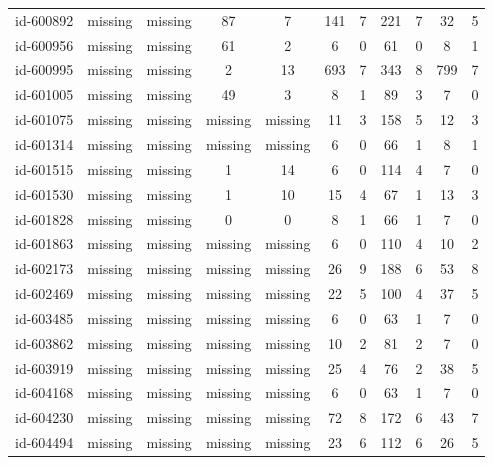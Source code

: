 \begin{tabular}{ccccccccccc}
id-600892 & missing & missing & 87 & 7 & 141 & 7 & 221 & 7 & 32 & 5\\
id-600956 & missing & missing & 61 & 2 & 6 & 0 & 61 & 0 & 8 & 1\\
id-600995 & missing & missing & 2 & 13 & 693 & 7 & 343 & 8 & 799 & 7\\
id-601005 & missing & missing & 49 & 3 & 8 & 1 & 89 & 3 & 7 & 0\\
id-601075 & missing & missing & missing & missing & 11 & 3 & 158 & 5 & 12 & 3\\
id-601314 & missing & missing & missing & missing & 6 & 0 & 66 & 1 & 8 & 1\\
id-601515 & missing & missing & 1 & 14 & 6 & 0 & 114 & 4 & 7 & 0\\
id-601530 & missing & missing & 1 & 10 & 15 & 4 & 67 & 1 & 13 & 3\\
id-601828 & missing & missing & 0 & 0 & 8 & 1 & 66 & 1 & 7 & 0\\
id-601863 & missing & missing & missing & missing & 6 & 0 & 110 & 4 & 10 & 2\\
id-602173 & missing & missing & missing & missing & 26 & 9 & 188 & 6 & 53 & 8\\
id-602469 & missing & missing & missing & missing & 22 & 5 & 100 & 4 & 37 & 5\\
id-603485 & missing & missing & missing & missing & 6 & 0 & 63 & 1 & 7 & 0\\
id-603862 & missing & missing & missing & missing & 10 & 2 & 81 & 2 & 7 & 0\\
id-603919 & missing & missing & missing & missing & 25 & 4 & 76 & 2 & 38 & 5\\
id-604168 & missing & missing & missing & missing & 6 & 0 & 63 & 1 & 7 & 0\\
id-604230 & missing & missing & missing & missing & 72 & 8 & 172 & 6 & 43 & 7\\
id-604494 & missing & missing & missing & missing & 23 & 6 & 112 & 6 & 26 & 5\\
\end{tabular}
